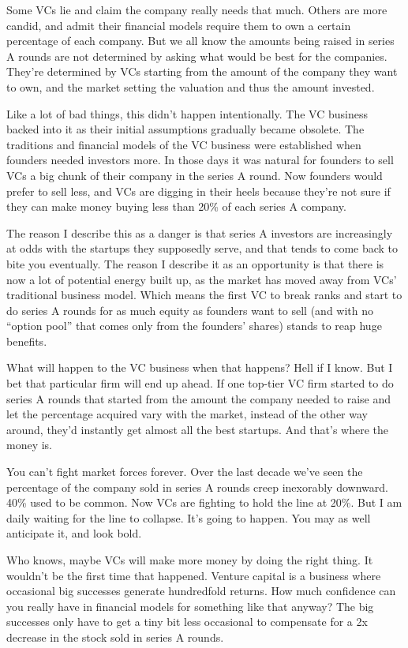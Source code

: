 Some VCs lie and claim the company really needs that much. Others are
more candid, and admit their financial models require them to own a
certain percentage of each company. But we all know the amounts being
raised in series A rounds are not determined by asking what would be
best for the companies. They're determined by VCs starting from the
amount of the company they want to own, and the market setting the
valuation and thus the amount invested.

Like a lot of bad things, this didn't happen intentionally. The VC
business backed into it as their initial assumptions gradually became
obsolete. The traditions and financial models of the VC business were
established when founders needed investors more. In those days it was
natural for founders to sell VCs a big chunk of their company in the
series A round. Now founders would prefer to sell less, and VCs are
digging in their heels because they're not sure if they can make money
buying less than 20\% of each series A company.

The reason I describe this as a danger is that series A investors are
increasingly at odds with the startups they supposedly serve, and that
tends to come back to bite you eventually. The reason I describe it as
an opportunity is that there is now a lot of potential energy built up,
as the market has moved away from VCs' traditional business model. Which
means the first VC to break ranks and start to do series A rounds for as
much equity as founders want to sell (and with no ``option pool'' that
comes only from the founders' shares) stands to reap huge benefits.

What will happen to the VC business when that happens? Hell if I know.
But I bet that particular firm will end up ahead. If one top-tier VC
firm started to do series A rounds that started from the amount the
company needed to raise and let the percentage acquired vary with the
market, instead of the other way around, they'd instantly get almost all
the best startups. And that's where the money is.

You can't fight market forces forever. Over the last decade we've seen
the percentage of the company sold in series A rounds creep inexorably
downward. 40\% used to be common. Now VCs are fighting to hold the line
at 20\%. But I am daily waiting for the line to collapse. It's going to
happen. You may as well anticipate it, and look bold.

Who knows, maybe VCs will make more money by doing the right thing. It
wouldn't be the first time that happened. Venture capital is a business
where occasional big successes generate hundredfold returns. How much
confidence can you really have in financial models for something like
that anyway? The big successes only have to get a tiny bit less
occasional to compensate for a 2x decrease in the stock sold in series A
rounds.

